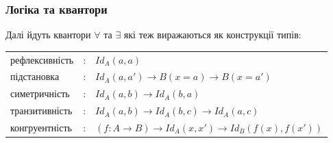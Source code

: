 \documentclass[11pt,oneside]{article}
\begin{document}
\newpage

  \subsubsection*{Логіка та квантори}

Далі йдуть квантори $\forall$ та $\exists$ які теж виражаються як конструкції типів:

\begingroup
\parbox[t][][l]{0.40\textwidth}{

\begin{prooftree}
\end{prooftree}

\begin{prooftree}
\end{prooftree}

}
\hspace{0.1cm}
\parbox[t][][r]{0.60\textwidth}{

\begin{prooftree}
\end{prooftree}


\begin{prooftree}
\end{prooftree}

}
\endgroup

\begingroup
\parbox[t][][l]{0.40\textwidth}{

\begin{prooftree}
\end{prooftree}

}
\hspace{0.1cm}
\parbox[t][][r]{0.60\textwidth}{

}\endgroup


\begin{center}
\begin{tabular}{lll}
  рефлексивність &:& $Id_A(a,a)$ \\
  підстановка     &:& $Id_A(a,a') \rightarrow B(x=a) \rightarrow B(x=a')$ \\
  симетричність  &:& $Id_A(a,b) \rightarrow Id_A(b,a)$  \\
  транзитивність &:& $Id_A(a,b) \rightarrow Id_A(b,c) \rightarrow Id_A(a,c)$ \\
  конгруентність &:& $(f: A \rightarrow B) \rightarrow Id_A(x,x') \rightarrow Id_B(f(x),f(x'))$ \\
\end{tabular}
\end{center}
\end{document}
